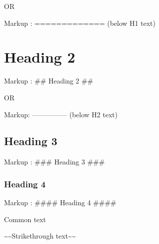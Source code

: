 \documentclass[letterpaper,10pt,english]{sphinxmanual}
\begin{document}
\sphinxAtStartPar
\sphinxhyphen{}OR\sphinxhyphen{}

\sphinxAtStartPar
Markup :  ============= (below H1 text)


\section{Heading 2}
\label{\detokenize{chapter3:heading-2}}
\sphinxAtStartPar
Markup :  \#\# Heading 2 \#\#

\sphinxAtStartPar
\sphinxhyphen{}OR\sphinxhyphen{}

\sphinxAtStartPar
Markup: ————— (below H2 text)


\subsection{Heading 3}
\label{\detokenize{chapter3:heading-3}}
\sphinxAtStartPar
Markup :  \#\#\# Heading 3 \#\#\#


\subsubsection{Heading 4}
\label{\detokenize{chapter3:heading-4}}
\sphinxAtStartPar
Markup :  \#\#\#\# Heading 4 \#\#\#\#

\sphinxAtStartPar
Common text

\begin{sphinxVerbatim}[commandchars=\\\{\}]
    
\end{sphinxVerbatim}

\sphinxAtStartPar
{}

\begin{sphinxVerbatim}[commandchars=\\\{\}]
       
\end{sphinxVerbatim}

\sphinxAtStartPar
\textasciitilde{}\textasciitilde{}Strikethrough text\textasciitilde{}\textasciitilde{}

\begin{sphinxVerbatim}[commandchars=\\\{\}]
    
\end{sphinxVerbatim}
\end{document}
